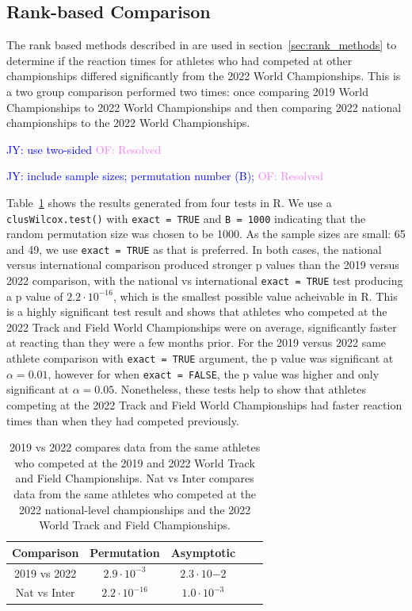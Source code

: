 \documentclass[12pt, letterpaper, titlepage]{article}
\newcommand{\jy}[1]{\textcolor{blue}{JY: #1}}
\newcommand{\of}[1]{\textcolor{violet}{OF: #1}}
\begin{document}
\subsection{Rank-based Comparison} \label{subsec:Results_Rank}

The rank based methods described in are used in section~\ref{sec:rank_methods}
to determine if the reaction times for athletes who had competed at other 
championships differed significantly from the 2022 World Championships.  This is
a two group comparison performed two times: once comparing 2019 World
Championships to 2022 World Championships and then comparing 2022 national
championships to the 2022 World Championships.

\jy{use two-sided}
\of{Resolved}

\jy{include sample sizes; permutation number (B);}
\of{Resolved}



Table~\ref{tab:Clusrankresults} shows the results generated from four tests in R.
We use a \texttt{clusWilcox.test()} with \texttt{exact = TRUE} and 
\texttt{B = 1000} indicating that the random permutation size was chosen to be 
1000.  As the sample sizes are small: 65 and 49, we use \texttt{exact = TRUE} as
that is preferred.  In both cases, the national versus international comparison
produced stronger p values than the 2019 versus 2022 comparison, with the
national vs international \texttt{exact = TRUE} test producing a p value of 
$2.2\cdot10^{-16}$, which is the smallest possible value acheivable in R.  This
is a highly significant test result and shows that athletes who competed at the
2022 Track and Field World Championships were on average, significantly faster
at reacting than they were a few months prior.  For the 2019 versus 2022
same athlete comparison with \texttt{exact = TRUE} argument, the p value was
significant at $\alpha = 0.01$, however for when \texttt{exact = FALSE}, the p
value was higher and only significant at $\alpha = 0.05$. Nonetheless, these
tests help to show that athletes competing at the 2022 Track and Field World
Championships had faster reaction times than when they had competed previously.

\begin{table}
  \centering
  \caption{}
  \begin{tabular}{c c c c c} 
   \toprule
   Comparison & Permutation & Asymptotic \\ 
   \midrule
   2019 vs 2022 & $2.9\cdot10^{-3}$ & $2.3\cdot10{-2}$ \\ 
   Nat vs Inter & $2.2\cdot10^{-16}$ & $1.0\cdot10^{-3}$ \\
   \bottomrule
  \end{tabular}
  \caption{2019 vs 2022 compares data from the same athletes who competed at the
  2019 and 2022 World Track and Field Championships. Nat vs Inter compares data
  from the same athletes who competed at the 2022 national-level championships
  and the 2022 World Track and Field Championships.}
  \label{tab:Clusrankresults}
\end{table}
\end{document}

